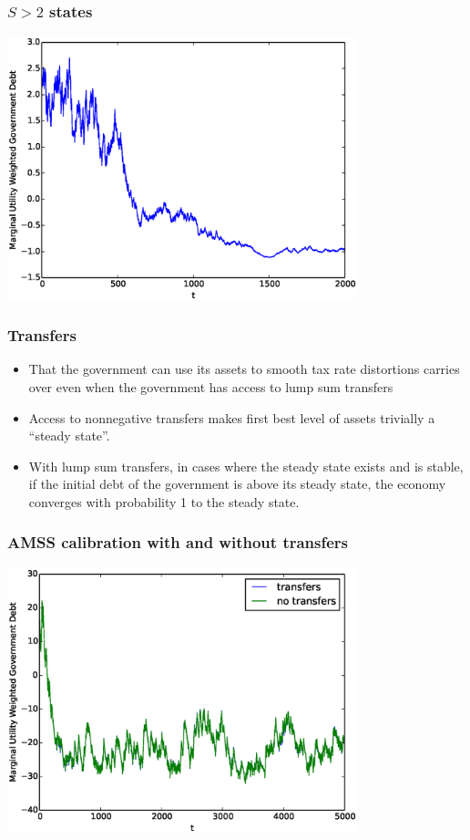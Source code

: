 \documentclass{beamer}
\begin{document}
\begin{frame}
	\frametitle{$S>2$ states}
	\begin{center}
	\includegraphics[width=4in]{Images/5stateiid.eps}
	\end{center}
\end{frame}



 \begin{frame}
  \frametitle{Transfers}
	\begin{itemize}
	\item  That the government can use its assets to smooth tax rate distortions carries over even when the government has access to lump sum transfers
	\item Access to nonnegative transfers makes first best level of assets trivially a ``steady state''.    	
\item  With lump sum transfers,  in cases where the steady state exists and is stable, if the initial debt of the government is above its steady state,  the economy  converges with probability 1 to the steady state.
		
	\end{itemize}
 \end{frame}

 \begin{frame}
	\frametitle{AMSS calibration with and without transfers}
	\begin{center}
	\includegraphics[width=4in]{Images/transfer_example1.eps}
	\end{center}
\end{frame}
\end{document}
